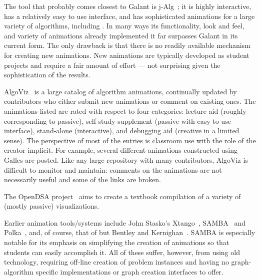 The tool that probably comes closest to Galant is j-Alg~\cite{j-Alg};
it is highly interactive, has a relatively easy to use interface, and has sophisticated animations for a large variety of algorithms,
including .
In many ways its functionality, look and feel, and variety of animations
already implemented it far surpasses Galant in its current form.
The only drawback is that there is no readily available mechanism
for creating new animations.
New animations are typically developed as
student projects and require a fair amount of effort --- not surprising given
the sophistication of the results.



AlgoViz~\cite{AlgoViz}
is a large catalog of algorithm animations, continually updated by
contributors who either submit new animations or comment on existing ones.
The animations listed are rated with respect to four categories:
lecture aid (roughly corresponding to passive), self study supplement (passive with
easy to use interface),
stand-alone (interactive),
and debugging aid (creative in a limited sense).
The perspective of most of the entries is classroom use with the role of the
creator implicit.
For example, several different animations constructed using Galles are posted.
Like any large repository with many contributors, AlgoViz is difficult to
monitor and
maintain: comments on the animations are not necessarily useful and some of the links are broken.


The OpenDSA project~\cite{%
2011-ProgramVisualization-Shaffer,2011-Koli-Shaffer,2012-SIGCSE-Fouh%
}
aims to create a textbook compilation of a variety of
(mostly passive) visualizations.

Earlier animation tools/systems include John Stasko's Xtango~\cite{Xtango},
SAMBA~\cite{SAMBA} and Polka~\cite{Polka,1992-TR_GIT-Stasko}, and, of course,
that of but
Bentley and Kernighan~\cite{1987-Animation-Bentley}.
SAMBA is especially notable for its emphasis on simplifying the creation of
animations so that students can easily accomplish it.
All of these suffer, however, from using old technology, requiring off-line creation
of problem instances and having no graph-algorithm specific implementations
or graph creation interfaces to offer.

